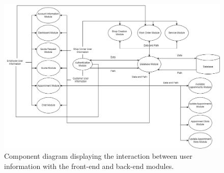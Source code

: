 \documentclass[12pt, titlepage]{article}
\begin{document}
\begin{figure}[H]
\centering
 \includegraphics[width=1\textwidth]{ComponentDiagram.png}
\caption{Component diagram displaying the interaction between user information with the front-end and back-end modules.}
\label{Fig_ComponentDiagram} 
\end{figure}
\end{document}

